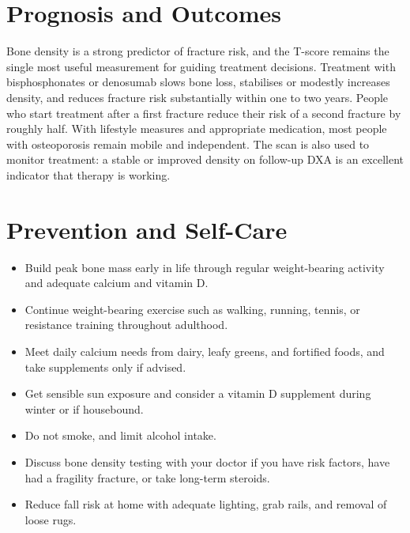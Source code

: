 \section*{Prognosis and Outcomes}
Bone density is a strong predictor of fracture risk, and the T-score remains the single most useful measurement for guiding treatment decisions. Treatment with bisphosphonates or denosumab slows bone loss, stabilises or modestly increases density, and reduces fracture risk substantially within one to two years. People who start treatment after a first fracture reduce their risk of a second fracture by roughly half. With lifestyle measures and appropriate medication, most people with osteoporosis remain mobile and independent. The scan is also used to monitor treatment: a stable or improved density on follow-up DXA is an excellent indicator that therapy is working.

\section*{Prevention and Self-Care}
\begin{itemize}
    \item Build peak bone mass early in life through regular weight-bearing activity and adequate calcium and vitamin D.
    \item Continue weight-bearing exercise such as walking, running, tennis, or resistance training throughout adulthood.
    \item Meet daily calcium needs from dairy, leafy greens, and fortified foods, and take supplements only if advised.
    \item Get sensible sun exposure and consider a vitamin D supplement during winter or if housebound.
    \item Do not smoke, and limit alcohol intake.
    \item Discuss bone density testing with your doctor if you have risk factors, have had a fragility fracture, or take long-term steroids.
    \item Reduce fall risk at home with adequate lighting, grab rails, and removal of loose rugs.
\end{itemize}

